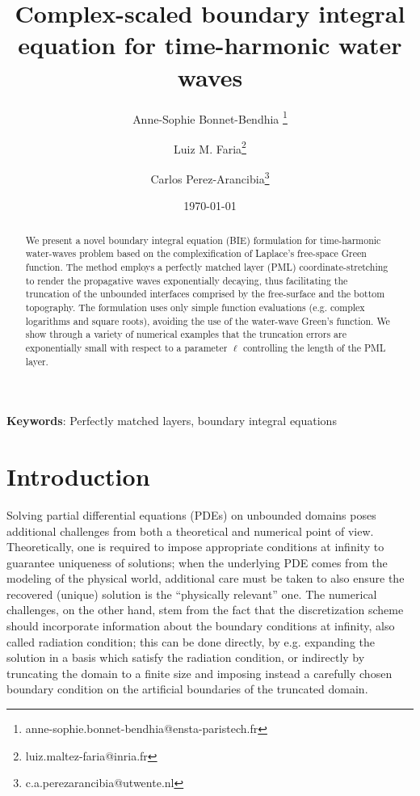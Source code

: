 \documentclass[11pt]{article}
\title{Complex-scaled boundary integral equation for time-harmonic water waves}
\author[1]{Anne-Sophie Bonnet-Bendhia \thanks{anne-sophie.bonnet-bendhia@ensta-paristech.fr}}
\author[1]{Luiz M. Faria\thanks{luiz.maltez-faria@inria.fr}}
\author[2]{Carlos Perez-Arancibia\thanks{c.a.perezarancibia@utwente.nl}}
\affil[1]{\small{Laboratoire POEMS, CNRS/ENSTA/INRIA, France}}
\affil[2]{\small{Univeristy of Twente, Netherlands}}
\date{\today}
\begin{document}
\maketitle

\begin{abstract}  
  We present a novel boundary integral equation (BIE) formulation for
  time-harmonic water-waves problem based on the complexification of Laplace's
  free-space Green function. The method employs a perfectly matched layer (PML)
  coordinate-stretching to render the propagative waves exponentially decaying,
  thus facilitating the truncation of the unbounded interfaces comprised by the
  free-surface and the bottom topography. The formulation uses only simple
  function evaluations (e.g. complex logarithms and square roots), avoiding the
  use of the water-wave Green’s function. We show through a variety of numerical
  examples that the truncation errors are exponentially small with respect to a
  parameter $\ell$ controlling the length of the PML layer.
\end{abstract}

 \textbf{Keywords}: Perfectly matched layers, boundary integral equations \\


\tableofcontents

\section{Introduction}

Solving partial differential equations (PDEs) on unbounded domains poses
additional challenges from both a theoretical and numerical point of view.
Theoretically, one is required to impose appropriate conditions at infinity to
guarantee uniqueness of solutions; when the underlying PDE comes from the
modeling of the physical world, additional care must be taken to also ensure the
recovered (unique) solution is the ``physically relevant'' one. The numerical
challenges, on the other hand, stem from the fact that the discretization scheme
should incorporate information about the boundary conditions at infinity, also
called radiation condition; this can be done directly, by e.g. expanding the
solution in a basis which satisfy the radiation condition, or indirectly by
truncating the domain to a finite size and imposing instead a carefully chosen
boundary condition on the artificial boundaries of the truncated domain.
\end{document}
